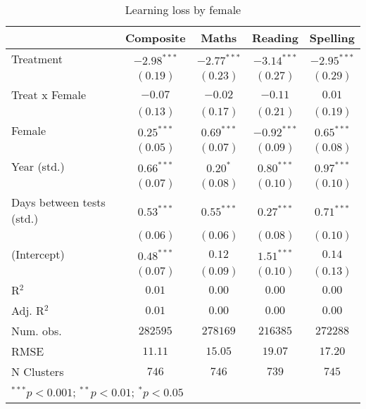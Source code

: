 
\begin{table}
\begin{center}
\begin{tabular}{l c c c c}
\hline
 & Composite & Maths & Reading & Spelling \\
\hline
Treatment                 & $-2.98^{***}$ & $-2.77^{***}$ & $-3.14^{***}$ & $-2.95^{***}$ \\
                          & $(0.19)$      & $(0.23)$      & $(0.27)$      & $(0.29)$      \\
Treat x Female            & $-0.07$       & $-0.02$       & $-0.11$       & $0.01$        \\
                          & $(0.13)$      & $(0.17)$      & $(0.21)$      & $(0.19)$      \\
Female                    & $0.25^{***}$  & $0.69^{***}$  & $-0.92^{***}$ & $0.65^{***}$  \\
                          & $(0.05)$      & $(0.07)$      & $(0.09)$      & $(0.08)$      \\
Year (std.)               & $0.66^{***}$  & $0.20^{*}$    & $0.80^{***}$  & $0.97^{***}$  \\
                          & $(0.07)$      & $(0.08)$      & $(0.10)$      & $(0.10)$      \\
Days between tests (std.) & $0.53^{***}$  & $0.55^{***}$  & $0.27^{***}$  & $0.71^{***}$  \\
                          & $(0.06)$      & $(0.06)$      & $(0.08)$      & $(0.10)$      \\
(Intercept)               & $0.48^{***}$  & $0.12$        & $1.51^{***}$  & $0.14$        \\
                          & $(0.07)$      & $(0.09)$      & $(0.10)$      & $(0.13)$      \\
\hline
R$^2$                     & $0.01$        & $0.00$        & $0.00$        & $0.00$        \\
Adj. R$^2$                & $0.01$        & $0.00$        & $0.00$        & $0.00$        \\
Num. obs.                 & $282595$      & $278169$      & $216385$      & $272288$      \\
RMSE                      & $11.11$       & $15.05$       & $19.07$       & $17.20$       \\
N Clusters                & $746$         & $746$         & $739$         & $745$         \\
\hline
\multicolumn{5}{l}{\scriptsize{$^{***}p<0.001$; $^{**}p<0.01$; $^{*}p<0.05$}}
\end{tabular}
\caption{Learning loss by female}
\label{tablefemale}
\end{center}
\end{table}
